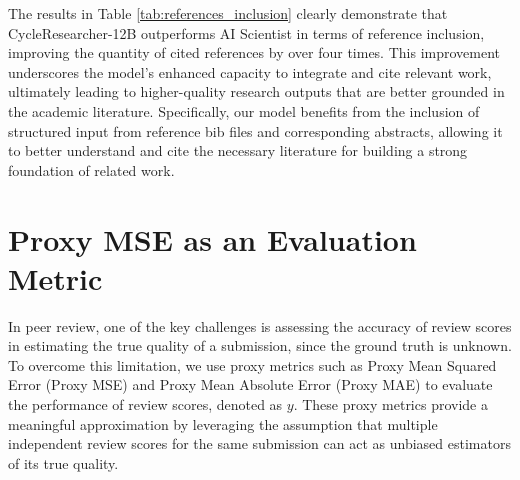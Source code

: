 \documentclass{article} %
\begin{document}
\begin{table}[h!]
\centering
\renewcommand{\arraystretch}{1.2}
\setlength{\tabcolsep}{10pt}
\caption{Comparison of average references included in papers generated by CycleResearcher-12B and AI Scientist.}
\vspace{0.3cm}
\label{tab:references_inclusion}
\vspace{0.2cm}

\end{table}

The results in Table \ref{tab:references_inclusion} clearly demonstrate that CycleResearcher-12B outperforms AI Scientist in terms of reference inclusion, improving the quantity of cited references by over four times. This improvement underscores the model’s enhanced capacity to integrate and cite relevant work, ultimately leading to higher-quality research outputs that are better grounded in the academic literature. Specifically, our model benefits from the inclusion of structured input from reference bib files and corresponding abstracts, allowing it to better understand and cite the necessary literature for building a strong foundation of related work.

\section{Proxy MSE as an Evaluation Metric}
\label{sec:D}
In peer review, one of the key challenges is assessing the accuracy of review scores in estimating the true quality of a submission, since the ground truth is unknown. To overcome this limitation, we use proxy metrics such as Proxy Mean Squared Error (Proxy MSE) and Proxy Mean Absolute Error (Proxy MAE) to evaluate the performance of review scores, denoted as $y$. These proxy metrics provide a meaningful approximation by leveraging the assumption that multiple independent review scores for the same submission can act as unbiased estimators of its true quality.
\end{document}

